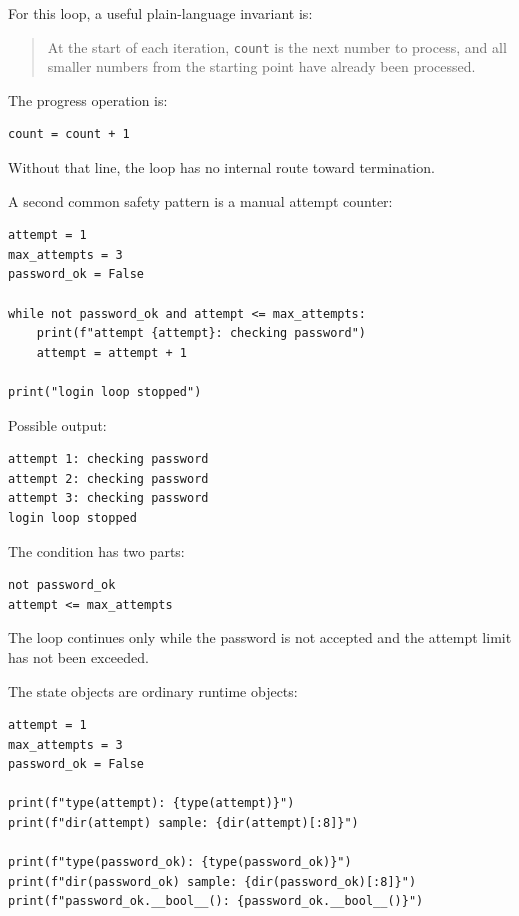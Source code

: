 For this loop, a useful plain-language invariant is:

\begin{quote}
At the start of each iteration, \texttt{count} is the next number to process, and all smaller numbers from the starting point have already been processed.
\end{quote}

The progress operation is:

\begin{verbatim}
count = count + 1
\end{verbatim}

Without that line, the loop has no internal route toward termination.

A second common safety pattern is a manual attempt counter:

\begin{verbatim}
attempt = 1
max_attempts = 3
password_ok = False

while not password_ok and attempt <= max_attempts:
    print(f"attempt {attempt}: checking password")
    attempt = attempt + 1

print("login loop stopped")
\end{verbatim}

Possible output:

\begin{verbatim}
attempt 1: checking password
attempt 2: checking password
attempt 3: checking password
login loop stopped
\end{verbatim}

The condition has two parts:

\begin{verbatim}
not password_ok
attempt <= max_attempts
\end{verbatim}

The loop continues only while the password is not accepted and the attempt limit has not been exceeded.

The state objects are ordinary runtime objects:

\begin{verbatim}
attempt = 1
max_attempts = 3
password_ok = False

print(f"type(attempt): {type(attempt)}")
print(f"dir(attempt) sample: {dir(attempt)[:8]}")

print(f"type(password_ok): {type(password_ok)}")
print(f"dir(password_ok) sample: {dir(password_ok)[:8]}")
print(f"password_ok.__bool__(): {password_ok.__bool__()}")
\end{verbatim}

